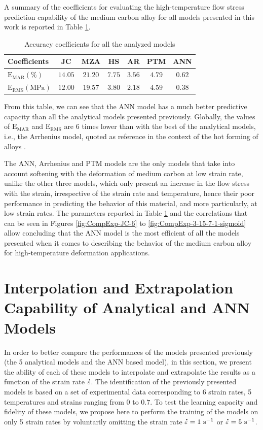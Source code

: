 \documentclass[twoside,english,1p,final,sort&compress]{elsarticle}
\makeatletter
\theoremstyle{plain}
\DeclareRobustCommand{\mdot}[1]{\accentset{\mbox{\bfseries .}}{#1}}
\DeclareRobustCommand{\ie}{i.e.\@\xspace}
\DeclareRobustCommand{\RMSE}{\text{E}_\text{RMS}}
\DeclareRobustCommand{\MARE}{\text{E}_\text{MAR}}
\DeclareRobustCommand{\ps}{\text{s}^{-1}}
\DeclareRobustCommand{\MPa}{\text{MPa}}
\makeatother
\begin{document}
A summary of the coefficients for evaluating the high-temperature flow stress prediction capability of the medium carbon alloy for all models presented in this work is reported in Table \ref{tab:Errors}.
\begin{table}[h!]
\centering
\caption{Accuracy coefficients for all the analyzed models}
\begin{tabular}{lcccccc}
	\hline
	Coefficients  &   JC    &   MZA   &   HS   &   AR   &  PTM   &  ANN   \\ \hline
	$\MARE(\%)$   & $14.05$ & $21.20$ & $7.75$ & $3.56$ & $4.79$ & $0.62$ \\
	$\RMSE(\MPa)$ & $12.00$ & $19.57$ & $3.80$ & $2.18$ & $4.59$ & $0.38$ \\ \hline
\end{tabular}
\label{tab:Errors}
\end{table}
From this table, we can see that the ANN model has a much better predictive capacity than all the analytical models presented previously.
Globally, the values of $\MARE$ and $\RMSE$ are $6$ times lower than with the best of the analytical models, \ie, the Arrhenius model, quoted as reference in the context of the hot forming of alloys \cite{Liang-2022}.

The ANN, Arrhenius and PTM models are the only models that take into account softening with the deformation of medium carbon at low strain rate, unlike the other three models, which only present an increase in the flow stress with the strain, irrespective of the strain rate and temperature, hence their poor performance in predicting the behavior of this material, and more particularly, at low strain rates.
The parameters reported in Table \ref{tab:Errors} and the correlations that can be seen in Figures \ref{fig:CompExp-JC-6} to \ref{fig:CompExp-3-15-7-1-sigmoid} allow concluding that the ANN model is the most efficient of all the models presented when it comes to describing the behavior of the medium carbon alloy for high-temperature deformation applications.

\section{Interpolation and Extrapolation Capability of Analytical and ANN Models \label{sec:IntExt}}

In order to better compare the performances of the models presented previously (the 5 analytical models and the ANN based model), in this section, we present the ability of each of these models to interpolate and extrapolate the results as a function of the strain rate $\mdot\varepsilon$.
The identification of the previously presented models is based on a set of experimental data corresponding to 6 strain rates, 5 temperatures and strains ranging from $0$ to $0.7$.
To test the learning capacity and fidelity of these models, we propose here to perform the training of the models on only 5 strain rates by voluntarily omitting the strain rate $\mdot\varepsilon=1~\ps$ or $\mdot\varepsilon=5~\ps$.
\end{document}

